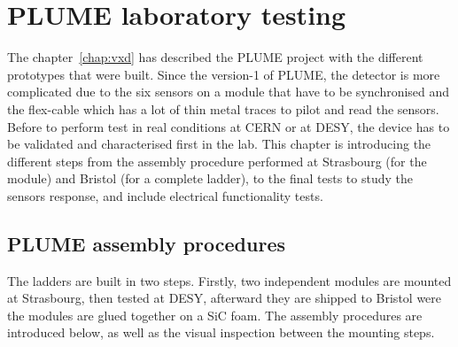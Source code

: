 \chapter{PLUME laboratory testing}
\label{chap:labTests}

  The chapter~\ref{chap:vxd} has described the \gls{PLUME} project with the different prototypes that were built. 
  Since the version-1 of \gls{PLUME}, the detector is more complicated due to the six sensors on a module that have to be synchronised and the flex-cable which has a lot of thin metal traces to pilot and read the sensors.
  Before to perform test in real conditions at CERN or at DESY, the device has to be validated and characterised first in the lab.
  This chapter is introducing the different steps from the assembly procedure performed at Strasbourg (for the module) and Bristol (for a complete ladder), to the final tests to study the sensors response, and include electrical functionality tests.

 
 \minitoc
  

\section{PLUME assembly procedures}

  The ladders are built in two steps. 
  Firstly, two independent modules are mounted at Strasbourg, then tested at DESY, afterward they are shipped to Bristol were the modules are glued together on a \gls{SiC} foam.
  The assembly procedures are introduced below, as well as the visual inspection between the mounting steps.

